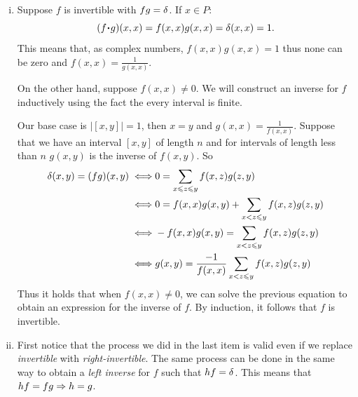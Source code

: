 \documentclass[12pt]{memoir}
\begin{document}
\begin{ptcbr}
    \begin{enumerate}[i)]
        \itemsep=-0.4em
        \item Suppose $f$ is invertible with $fg=\delta$. If $x\in P$:
        $$(f\.g)(x,x)=f(x,x)g(x,x)=\dl(x,x)=1.$$
        This means that, as complex numbers, $f(x,x)g(x,x)=1$ thus none can be zero and $f(x,x)=\frac{1}{g(x,x)}$.\par 
        On the other hand, suppose $f(x,x)\neq 0$. We will construct an inverse for $f$ inductively using the fact the every interval is finite.\par
        Our base case is $|[x,y]|=1$, then $x=y$ and $g(x,x)=\frac{1}{f(x,x)}$. Suppose that we have an interval $[x,y]$ of length $n$ and for intervals of length less than $n$ $g(x,y)$ is the inverse of $f(x,y)$. So 
        \begin{align*}
            \delta(x,y)=(fg)(x,y)\iff &0=\sum_{x\leqslant z\leqslant y}f(x,z)g(z,y)\\
            \iff &0=f(x,x)g(x,y)+\sum_{x< z\leqslant y}f(x,z)g(z,y)\\
            \iff &-f(x,x)g(x,y)=\sum_{x< z\leqslant y}f(x,z)g(z,y)\\
            \iff &g(x,y)=\frac{-1}{f(x,x)}\sum_{x< z\leqslant y}f(x,z)g(z,y)
        \end{align*}
        Thus it holds that when $f(x,x)\neq 0$, we can solve the previous equation to obtain an expression for the inverse of $f$. By induction, it follows that $f$ is invertible. 
        \item First notice that the process we did in the last item is valid even if we replace \emph{invertible} with \emph{right-invertible}. The same process can be done in the same way to obtain a \emph{left inverse} for $f$ such that $hf=\delta$. This means that $hf=fg\Rightarrow h=g$.

    \end{enumerate}
\end{ptcbr}
\end{document}
